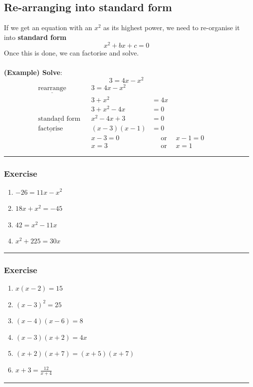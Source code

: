\documentclass[a4paper,12pt]{article}
\newcommand\question{
	 \rule[0pt]{17cm}{0.5pt}\vspace{-0.5cm}
	\subsubsection{Exercise}

}
\newcommand\questionend{
	\rule[0pt]{17cm}{0.5pt}\vspace{0.0cm}\\
}
\begin{document}
\subsection{Re-arranging into standard form}
If we get an equation with an $x^2$ as its highest power, we need to re-organise it into \textbf{standard form}
$$x^2 +bx +c =0$$
Once this is done, we can factorise and solve.\\\\
\textbf{(Example) Solve}: 
$$3=4x - x^2$$
\begin{align*}
\underline{\text{rearrange}} &&3=4x - x^2&&&\\
								&&3+x^2& =4x&&\\
                               &&3+x^2 -4x&=0&&\\
\underline{\text{standard form}}&&x^2 -4x+3&=0&&\\
\underline{\text{factorise}}&&(x-3)(x-1)&=0&&\\
							  &&x-3 = 0&\text{~~~~or~~~~} x-1=0&&\\
							  &&x=3  &\text{~~~~or~~~~} x=1&&
\end{align*}

\question
\begin{multicols}{2}
	\begin{enumerate}[label=\normalsize \alph*)~~~]
		\item $ -26  = 11x -x^2$ 
		\item $ 18x + x^2 = -45$ 
		\item $  42=x^2 - 11x$ 
		\item $ x^2 + 225=30x$ 
	\end{enumerate}
\end{multicols}
\question
\begin{multicols}{2}
	\begin{enumerate}[label=\normalsize \alph*)~~~]
			\item $ x(x-2)=15$ 
			\item $ (x-3)^2= 25$ 
			\item $  (x-4)(x-6)=8$ 
			\item $ (x-3)(x+2)=4x$ 
			\item $  (x+2)(x+7)=(x+5)(x+7)$ 
			\item $ \displaystyle x+3 = \frac{12}{x+4}$ 
	\end{enumerate}
\end{multicols}
\questionend
\newpage
\end{document}
